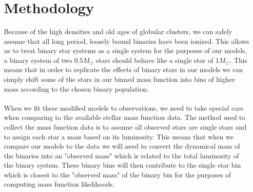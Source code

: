 \documentclass[12pt,letterpaper]{article}
\begin{document}
\section{Methodology}
\paragraph{}
Because of the high densities and old ages of globular clusters, we can safely assume that all long
period, loosely bound binaries have been ionized. This allows us to treat binary star systems as a
single system for the purposes of our models, a binary system of two $0.5 M_\odot$ stars should
behave like a single star of $ 1 M_\odot$. This means that in order to replicate the effects of
binary stars in our models we can simply shift some of the stars in our binned mass function into
bins of higher mass according to the chosen binary population.
\paragraph{}
When we fit these modified models to observations, we need to take special care when comparing to
the available stellar mass function data. The method used to collect the mass function data is to
assume all observed stars are single stars and to assign each star a mass based on its luminosity.
This means that when we compare our models to the data we will need to convert the dynamical mass of
the binaries into an "observed mass" which is related to the total luminosity of the binary system.
These binary bins will then contribute to the single star bin which is closest to the "observed
mass" of the binary bin for the purposes of computing mass function likelihoods.
\end{document}

